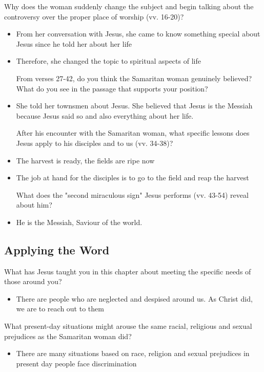\documentclass[11pt]{article}
\begin{document}
Why does the woman suddenly change the subject and begin talking
about the controversy over the proper place of worship (vv. 16-20)?
\begin{itemize}
\item From her conversation with Jesus, she came to know something special
about Jesus since he told her about her life

\item Therefore, she changed the topic to spiritual aspects of life

From verses 27-42, do you think the Samaritan woman genuinely
 believed? What do you see in the passage that supports your
 position?
\item She told her townsmen about Jesus. She believed that Jesus is the
Messiah because Jesus said so and also everything about her life.

After his encounter with the Samaritan woman, what specific lessons
 does Jesus apply to his disciples and to us (vv. 34-38)?
\item The harvest is ready, the fields are ripe now
\item The job at hand for the disciples is to go to the field and reap the
harvest

What does the "second miraculous sign" Jesus performs (vv. 43-54)
 reveal about him?
\item He is the Messiah, Saviour of the world.
\end{itemize}

\subsection{Applying the Word}
\label{sec:org1863306}

What has Jesus taught you in this chapter about meeting the specific
needs of those around you?
\begin{itemize}
\item There are people who are neglected and despised around us. As
Christ did, we are to reach out to them
\end{itemize}

What present-day situations might arouse the same racial, religious
and sexual prejudices as the Samaritan woman did?
\begin{itemize}
\item There are many situations based on race, religion and sexual
prejudices in present day people face discrimination
\end{itemize}
\end{document}
